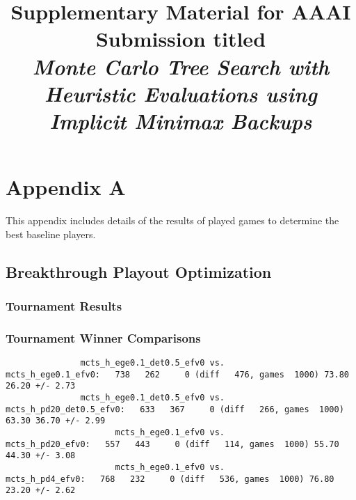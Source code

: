 \documentclass{article}
\title{Supplementary Material for AAAI Submission titled\\{\it Monte Carlo Tree Search with Heuristic Evaluations using Implicit Minimax Backups}}
\author{}
\date{}
\begin{document}
\maketitle %

\section{Appendix A}

This appendix includes details of the results of played games to determine the best baseline players. 

\subsection{Breakthrough Playout Optimization}

\subsubsection{Tournament Results}

\subsubsection{Tournament Winner Comparisons}

\begin{verbatim}
               mcts_h_ege0.1_det0.5_efv0 vs.                       mcts_h_ege0.1_efv0:   738   262     0 (diff   476, games  1000) 73.80 26.20 +/- 2.73
               mcts_h_ege0.1_det0.5_efv0 vs.                  mcts_h_pd20_det0.5_efv0:   633   367     0 (diff   266, games  1000) 63.30 36.70 +/- 2.99
                      mcts_h_ege0.1_efv0 vs.                         mcts_h_pd20_efv0:   557   443     0 (diff   114, games  1000) 55.70 44.30 +/- 3.08
                      mcts_h_ege0.1_efv0 vs.                          mcts_h_pd4_efv0:   768   232     0 (diff   536, games  1000) 76.80 23.20 +/- 2.62
\end{verbatim}
\end{document}
